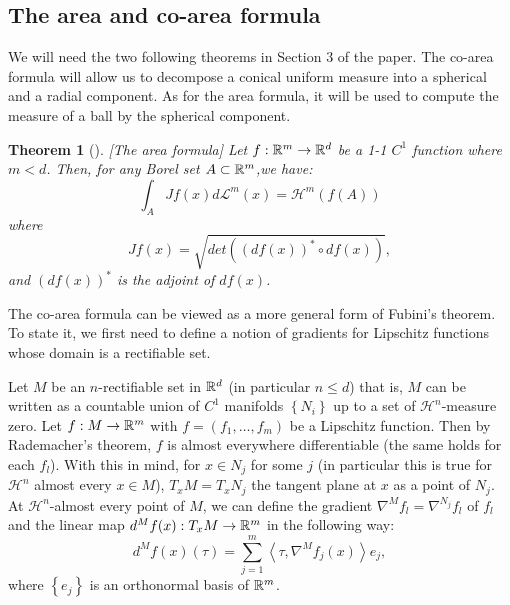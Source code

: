 \documentclass[11pt]{article}
\newtheorem{theorem}{Theorem}[section]
\theoremstyle{definition}
\theoremstyle{remark}
\numberwithin{equation}{section}
\begin{document}
\subsection{The area and co-area formula}
We will need the two following theorems in Section 3 of the paper. The co-area formula will allow us to decompose a conical uniform measure into a spherical and a radial component. 
As for the area formula, it will be used to compute the measure of a ball by the spherical component.


\begin{theorem}[{\cite{S}}][The area formula]
Let $f: \mathbb{R}^{m} \rightarrow \mathbb{R}^{d}$ be a 1-1 $C^{1}$ function where $m<d$. Then, for any  Borel set $A \subset \mathbb{R}^{m} $,we have:
\begin{equation}\label{area}
\int_{A} Jf(x) d\mathcal{L}^{m}(x)= \mathcal{H}^{m}(f(A))
\end{equation}
where \begin{equation}
Jf(x)= \sqrt{det((df(x))^{*}  \circ df(x)) },
\end{equation}
and $(df(x))^{*}$ is the adjoint of $df(x)$.
\end{theorem}

The co-area formula can be viewed as a more general form of Fubini's theorem. To state it, we first need to define a notion of gradients for Lipschitz functions whose domain is a rectifiable set.

Let $M$ be an $n$-rectifiable set in $\mathbb{R}^{d}$ (in particular $n \leq d$) that is, $M$ can be written as a countable union of $C^{1}$ manifolds $\left\lbrace N_i \right\rbrace $ up to a set of $\mathcal{H}^n$-measure zero. 
Let  $f: M \rightarrow \mathbb{R}^{m}$ with $f=(f_1, \ldots, f_m)$ be a Lipschitz function. Then by Rademacher's theorem, $f$ is almost everywhere differentiable (the same holds for each $f_l$).
With this in mind, for $x \in N_j$ for some $j$ (in particular this is true for $\mathcal{H}^{n}$ almost every $x \in M$), $T_{x}M = T_{x}N_{j}$ the tangent plane at $x$ as a point of $N_j$. At $\mathcal{H}^n$-almost every point of $M$, we can define the gradient $\nabla^{M} f_{l} = \nabla^{N_j}f_{l}$ of $f_{l}$  and the linear map $d^{M}f(x): T_{x}M \rightarrow \mathbb{R}^{m}$ in the following way:
\begin{equation}
 d^{M}f(x)(\tau)= \sum_{j=1}^{m} \left\langle \tau , \nabla^{M}f_{j}(x) \right\rangle e_{j},
\end{equation}
where $\left\lbrace e_j \right\rbrace$ is an orthonormal basis of $\mathbb{R}^{m}$.
\end{document}

